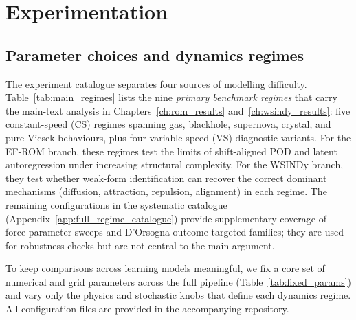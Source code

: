 \chapter{Experimentation}
\label{ch:experimentation}

\section{Parameter choices and dynamics regimes}
\label{sec:params_fixed}

The experiment catalogue separates four sources of modelling difficulty.
Table~\ref{tab:main_regimes} lists the nine \emph{primary benchmark regimes}
that carry the main-text analysis in Chapters~\ref{ch:rom_results}
and~\ref{ch:wsindy_results}: five constant-speed (CS) regimes spanning
gas, blackhole, supernova, crystal, and pure-Vicsek behaviours, plus four
variable-speed (VS) diagnostic variants.
For the EF-ROM branch, these regimes test the limits of shift-aligned POD
and latent autoregression under increasing structural complexity.
For the WSINDy branch, they test whether weak-form identification can
recover the correct dominant mechanisms (diffusion, attraction, repulsion,
alignment) in each regime.
The remaining configurations in the systematic catalogue
(Appendix~\ref{app:full_regime_catalogue}) provide supplementary coverage
of force-parameter sweeps and D'Orsogna outcome-targeted families; they are
used for robustness checks but are not central to the main argument.

To keep comparisons across learning models meaningful, we fix a core set of
numerical and grid parameters across the full pipeline
(Table~\ref{tab:fixed_params}) and vary only the physics and stochastic knobs
that define each dynamics regime.  All configuration files are provided in the accompanying repository.

